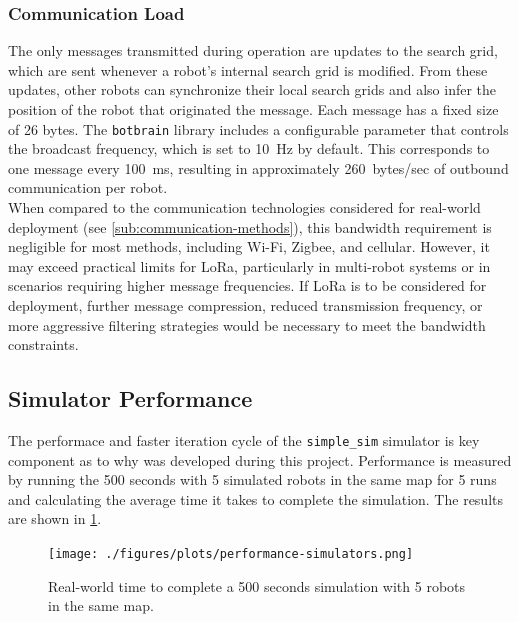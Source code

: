 \subsubsection{Communication Load}
The only messages transmitted during operation are updates to the search grid, which are sent whenever a robot’s internal search grid is modified. From these updates, other robots can synchronize their local search grids and also infer the position of the robot that originated the message. Each message has a fixed size of 26 bytes. The \texttt{botbrain} library includes a configurable parameter that controls the broadcast frequency, which is set to \SI{10}{Hz} by default. This corresponds to one message every \SI{100}{ms}, resulting in approximately \SI{260}{bytes/sec} of outbound communication per robot. \\

When compared to the communication technologies considered for real-world deployment (see \cref{sub:communication-methods}), this bandwidth requirement is negligible for most methods, including Wi-Fi, Zigbee, and cellular. However, it may exceed practical limits for LoRa, particularly in multi-robot systems or in scenarios requiring higher message frequencies. If LoRa is to be considered for deployment, further message compression, reduced transmission frequency, or more aggressive filtering strategies would be necessary to meet the bandwidth constraints.

\subsection{Simulator Performance}
\label{sec:simulator-performance}
The performace and faster iteration cycle of the \texttt{simple\_sim} simulator is key component as to why was developed during this project. Performance is measured by running the 500 seconds with 5 simulated robots in the same map for 5 runs and calculating the average time it takes to complete the simulation. The results are shown in \cref{fig:simulator-performance}.

\begin{figure}[H]
    \begin{center}
        \texttt{[image: ./figures/plots/performance-simulators.png]}
    \end{center}
    \caption{Real-world time to complete a 500 seconds simulation with 5 robots in the same map.}
    \label{fig:simulator-performance}
\end{figure}
